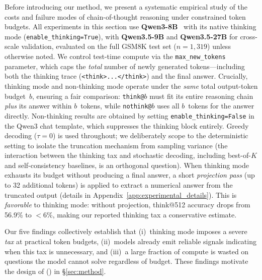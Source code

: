 
Before introducing our method, we present a systematic empirical study of
the costs and failure modes of chain-of-thought reasoning under constrained
token budgets.  All experiments in this section use
\textbf{Qwen3-8B}~\cite{qwen3_2025} with its native thinking mode
(\texttt{enable\_thinking=True}), with \textbf{Qwen3.5-9B} and
\textbf{Qwen3.5-27B} for cross-scale validation,
evaluated on the full GSM8K test set ($n{=}1{,}319$)
unless otherwise noted.
We control test-time compute via the \texttt{max\_new\_tokens} parameter,
which caps the \emph{total} number of newly generated tokens---including
both the thinking trace (\texttt{<think>...<\!/think>}) and the final answer.
Crucially, thinking mode and non-thinking mode operate under the
\emph{same} total output-token budget~$b$, ensuring a fair comparison:
\texttt{think@$b$} must fit its entire reasoning chain \emph{plus}
its answer within $b$~tokens, while \texttt{nothink@$b$} uses all
$b$~tokens for the answer directly.
Non-thinking results are obtained by setting
\texttt{enable\_thinking=False} in the Qwen3 chat template, which
suppresses the thinking block entirely.
Greedy decoding ($\tau{=}0$) is used throughout; we deliberately scope to the deterministic setting to isolate the truncation mechanism from sampling variance (the interaction between the thinking tax and stochastic decoding, including best-of-$K$ and self-consistency baselines, is an orthogonal question).
When thinking mode exhausts its budget without producing a final answer,
a short \emph{projection pass} (up to 32 additional tokens) is applied to
extract a numerical answer from the truncated output
(details in Appendix~\ref{app:experimental_details}).
This is \emph{favorable} to thinking mode: without projection,
think@512 accuracy drops from 56.9\% to ${<}$6\%, making
our reported thinking tax a conservative estimate.

Our five findings collectively establish that (i)~thinking mode imposes a
severe \emph{tax} at practical token budgets, (ii)~models already emit
reliable signals indicating when this tax is unnecessary, and
(iii)~a large fraction of compute is wasted on questions the model
cannot solve regardless of budget.
These findings motivate the design of \method{} (\fullmethod{}) in
\S\ref{sec:method}.

